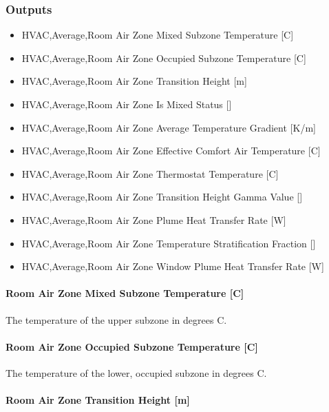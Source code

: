 \subsubsection{Outputs}\label{outputs-6-009}

\begin{itemize}
\item
  HVAC,Average,Room Air Zone Mixed Subzone Temperature {[}C{]}
\item
  HVAC,Average,Room Air Zone Occupied Subzone Temperature {[}C{]}
\item
  HVAC,Average,Room Air Zone Transition Height {[}m{]}
\item
  HVAC,Average,Room Air Zone Is Mixed Status {[]}
\item
  HVAC,Average,Room Air Zone Average Temperature Gradient {[}K/m{]}
\item
  HVAC,Average,Room Air Zone Effective Comfort Air Temperature {[}C{]}
\item
  HVAC,Average,Room Air Zone Thermostat Temperature {[}C{]}
\item
  HVAC,Average,Room Air Zone Transition Height Gamma Value {[]}
\item
  HVAC,Average,Room Air Zone Plume Heat Transfer Rate {[}W{]}
\item
  HVAC,Average,Room Air Zone Temperature Stratification Fraction {[]}
\item
  HVAC,Average,Room Air Zone Window Plume Heat Transfer Rate {[}W{]}
\end{itemize}

\paragraph{Room Air Zone Mixed Subzone Temperature {[}C{]}}\label{room-air-zone-mixed-subzone-temperature-c-1}

The temperature of the upper subzone in degrees C.

\paragraph{Room Air Zone Occupied Subzone Temperature {[}C{]}}\label{room-air-zone-occupied-subzone-temperature-c-1}

The temperature of the lower, occupied subzone in degrees C.

\paragraph{Room Air Zone Transition Height {[}m{]}}\label{room-air-zone-transition-height-m-1}

